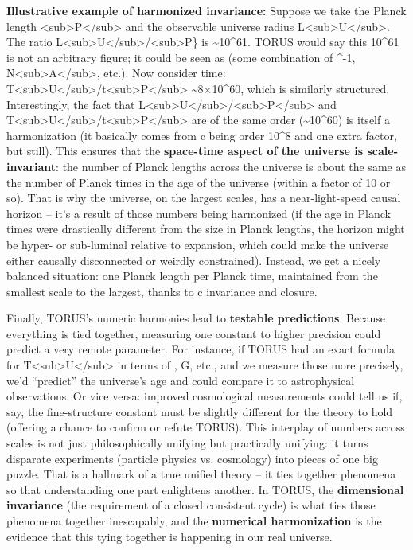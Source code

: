 \documentclass[
]{article}
\begin{document}
\textbf{Illustrative example of harmonized invariance:} Suppose we take
the Planck length
\ell\textless sub\textgreater P\textless/sub\textgreater{} and the
observable universe radius
L\textless sub\textgreater U\textless/sub\textgreater. The ratio
L\textless sub\textgreater U\textless/sub\textgreater/\ell\textless sub\textgreater P\}
is \textasciitilde10\^{}61. TORUS would say this 10\^{}61 is not an
arbitrary figure; it could be seen as (some combination of \alpha\^{}-1,
N\textless sub\textgreater A\textless/sub\textgreater, etc.). Now
consider time:
T\textless sub\textgreater U\textless/sub\textgreater/t\textless sub\textgreater P\textless/sub\textgreater{}
\textasciitilde8×10\^{}60, which is similarly structured. Interestingly,
the fact that
L\textless sub\textgreater U\textless/sub\textgreater/\ell\textless sub\textgreater P\textless/sub\textgreater{}
and
T\textless sub\textgreater U\textless/sub\textgreater/t\textless sub\textgreater P\textless/sub\textgreater{}
are of the same order (\textasciitilde10\^{}60) is itself a
harmonization (it basically comes from c being order 10\^{}8 and one
extra factor, but still). This ensures that the \textbf{space-time
aspect of the universe is scale-invariant}: the number of Planck lengths
across the universe is about the same as the number of Planck times in
the age of the universe (within a factor of 10 or so). That is why the
universe, on the largest scales, has a near-light-speed causal horizon
-- it's a result of those numbers being harmonized (if the age in Planck
times were drastically different from the size in Planck lengths, the
horizon might be hyper- or sub-luminal relative to expansion, which
could make the universe either causally disconnected or weirdly
constrained). Instead, we get a nicely balanced situation: one Planck
length per Planck time, maintained from the smallest scale to the
largest, thanks to c invariance and closure\hspace{0pt}.

Finally, TORUS's numeric harmonies lead to \textbf{testable
predictions}. Because everything is tied together, measuring one
constant to higher precision could predict a very remote parameter. For
instance, if TORUS had an exact formula for
T\textless sub\textgreater U\textless/sub\textgreater{} in terms of \alpha,
G, etc., and we measure those more precisely, we'd ``predict'' the
universe's age and could compare it to astrophysical observations. Or
vice versa: improved cosmological measurements could tell us if, say,
the fine-structure constant must be slightly different for the theory to
hold (offering a chance to confirm or refute TORUS). This interplay of
numbers across scales is not just philosophically unifying but
practically unifying: it turns disparate experiments (particle physics
vs. cosmology) into pieces of one big puzzle. That is a hallmark of a
true unified theory -- it ties together phenomena so that understanding
one part enlightens another. In TORUS, the \textbf{dimensional
invariance} (the requirement of a closed consistent cycle) is what ties
those phenomena together inescapably, and the \textbf{numerical
harmonization} is the evidence that this tying together is happening in
our real universe\hspace{0pt}.
\end{document}
